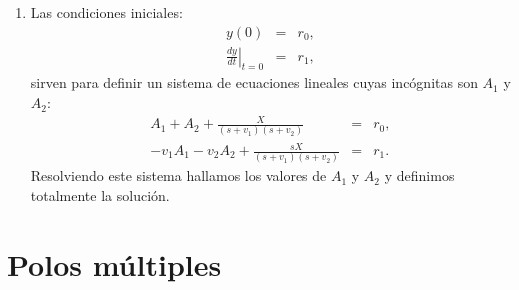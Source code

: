 \documentclass[11pt,a4paper,openany]{book}
\begin{document}
\begin{enumerate}
	\item Las condiciones iniciales: 
	\begin{eqnarray}
		y(0) &=& r_{0}, \\
		\left. \frac{dy}{dt} \right|_{t = 0} &=& r_{1},      
	\end{eqnarray}
	sirven para definir un sistema de ecuaciones lineales cuyas inc\'{o}gnitas son $A_{1}$ y $A_{2}$:
	\begin{eqnarray}
		A_{1} + A_{2} + \frac{X}{(s + v_{1})(s + v_{2})}  &=& r_{0},   \\
		-v_{1} A_{1} - v_{2} A_{2} + \frac{s X}{(s + v_{1})(s + v_{2})} &=& r_{1}.
	\end{eqnarray}
	Resolviendo este sistema hallamos los valores de $A_{1}$ y $A_{2}$ y definimos totalmente la soluci\'{o}n.
\end{enumerate}

\section{Polos m\'{u}ltiples}
\end{document}
